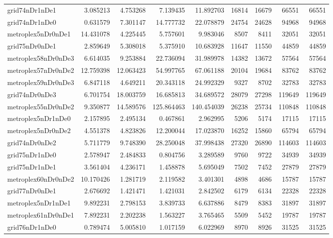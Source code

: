\begin{longtable}{|l|r|r|r|r|r|r|r|r|}
grid74nDr1nDe1 & 3.085213 & 4.753268 & 7.139435 & 11.892703 & 16814 & 16679 & 66551 & 66551 \\
grid74nDr1nDe0 & 0.631579 & 7.301147 & 14.777732 & 22.078879 & 24754 & 24628 & 94968 & 94968 \\
metroplex5nDr0nDe1 & 14.431078 & 4.225445 & 5.757601 & 9.983046 & 8507 & 8411 & 32051 & 32051 \\
grid75nDr0nDe1 & 2.859649 & 5.308018 & 5.375910 & 10.683928 & 11647 & 11550 & 44859 & 44859 \\
metroplex58nDr0nDe3 & 6.614035 & 9.253884 & 22.736094 & 31.989978 & 14382 & 13672 & 57564 & 57564 \\
metroplex57nDr0nDe2 & 12.759398 & 12.063423 & 54.997765 & 67.061188 & 20104 & 19684 & 83762 & 83762 \\
metroplex59nDr0nDe3 & 6.847118 & 4.649211 & 20.343118 & 24.992329 & 9327 & 8702 & 32783 & 32783 \\
grid74nDr0nDe3 & 6.701754 & 18.003759 & 16.685813 & 34.689572 & 28079 & 27298 & 119649 & 119649 \\
metroplex55nDr0nDe2 & 9.350877 & 14.589576 & 125.864463 & 140.454039 & 26238 & 25734 & 110848 & 110848 \\
metroplex5nDr1nDe0 & 2.157895 & 2.495134 & 0.467861 & 2.962995 & 5206 & 5174 & 17115 & 17115 \\
metroplex5nDr0nDe2 & 4.551378 & 4.823826 & 12.200044 & 17.023870 & 16252 & 15860 & 65794 & 65794 \\
grid74nDr0nDe2 & 5.711779 & 9.748390 & 28.250048 & 37.998438 & 27320 & 26890 & 114603 & 114603 \\
grid75nDr1nDe0 & 2.578947 & 2.484833 & 0.804756 & 3.289589 & 9760 & 9722 & 34939 & 34939 \\
grid75nDr1nDe1 & 3.561404 & 4.236171 & 1.458878 & 5.695049 & 7502 & 7452 & 27879 & 27879 \\
metroplex60nDr0nDe2 & 10.170426 & 1.281719 & 2.119582 & 3.401301 & 4898 & 4686 & 15787 & 15787 \\
grid77nDr0nDe1 & 2.676692 & 1.421471 & 1.421031 & 2.842502 & 6179 & 6134 & 22328 & 22328 \\
metroplex5nDr1nDe1 & 9.892231 & 2.798153 & 3.839733 & 6.637886 & 8479 & 8383 & 31897 & 31897 \\
metroplex61nDr0nDe1 & 7.892231 & 2.202238 & 1.563227 & 3.765465 & 5509 & 5452 & 19787 & 19787 \\
grid76nDr1nDe0 & 0.789474 & 5.005810 & 1.017159 & 6.022969 & 8970 & 8926 & 31525 & 31525 \\

\end{longtable}
